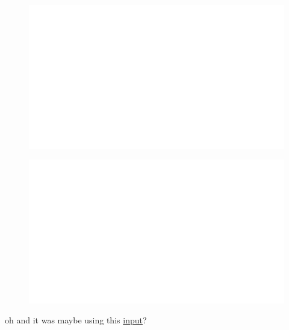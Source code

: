 \begin{centering}
    \begin{figure}[h]
        \centering
        \includegraphics[width=\textwidth]{whyareyoucheckingthenameofthisfile.png}
    \end{figure}
\end{centering}

\begin{centering}
    \begin{figure}
        \centering
        \includegraphics[width=\textwidth]{whyareyoucheckingthenameofthisfile.png}
    \end{figure}
\end{centering}
\noindent

oh and it was maybe using this \href{https://github.com/hairez/random-files/blob/main/cool-numbers-001.txt}{input}? 


